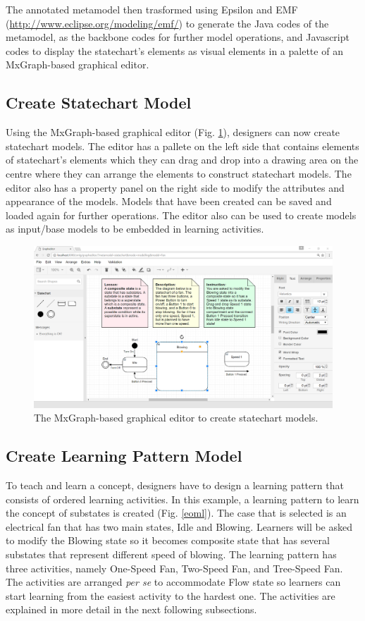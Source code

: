\documentclass[conference]{IEEEtran}
\begin{document}
The annotated metamodel then trasformed using Epsilon \cite{kolovos2010epsilon} and EMF (\url{http://www.eclipse.org/modeling/emf/}) to generate the Java codes of the metamodel, as the backbone codes for further model operations, and Javascript codes to display the statechart's elements as visual elements in a palette of an MxGraph-based graphical editor. 

\subsection{Create Statechart Model}
Using the MxGraph-based graphical editor (Fig. \ref{ide}), designers can now create statechart models. The editor has a pallete on the left side that contains elements of statechart's elements which they can drag and drop into a drawing area on the centre where they can arrange the elements to construct statechart models. The editor also has a property panel on the right side to modify the attributes and appearance of the models. Models that have been created can be saved and loaded again for further operations. The editor also can be used to create models as input/base models to be embedded in learning activities.        

\begin{figure}[th]
\centering
\includegraphics[width=\linewidth]{ide}
\caption{The MxGraph-based graphical editor to create statechart models.}
\label{ide}
\end{figure}

\subsection{Create Learning Pattern Model}
To teach and learn a concept, designers have to design a learning pattern that consists of ordered learning activities. In this example, a learning pattern to learn the concept of substates is created (Fig. \ref{eoml}). The case that is selected is an electrical fan that has two main states, Idle and Blowing. Learners will be asked to modify the Blowing state so it becomes composite state that has several substates that represent different speed of blowing. The learning pattern has three activities, namely One-Speed Fan, Two-Speed Fan, and Tree-Speed Fan. The activities are arranged \textit{per se} to accommodate Flow state \cite{csikszentmihalyi2014toward} so learners can start learning from the easiest activity to the hardest one. The activities are explained in more detail  in the next following subsections.
  
\end{document}
